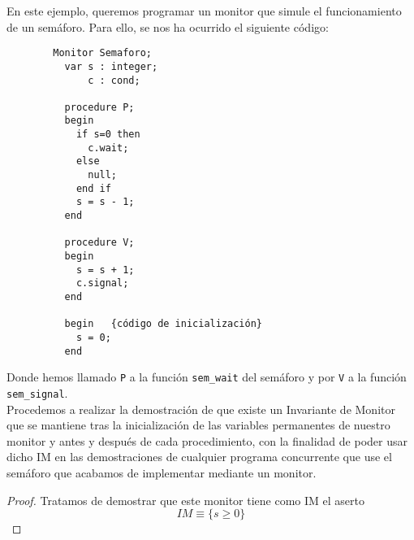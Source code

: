\begin{ejemplo}
    En este ejemplo, queremos programar un monitor que simule el funcionamiento de un semáforo. Para ello, se nos ha ocurrido el siguiente código:
    \begin{verbatim}
        Monitor Semaforo;
          var s : integer;
              c : cond;

          procedure P;
          begin
            if s=0 then
              c.wait;
            else
              null;
            end if
            s = s - 1;
          end

          procedure V;
          begin
            s = s + 1;
            c.signal;
          end

          begin   {código de inicialización}
            s = 0;
          end
    \end{verbatim}
    Donde hemos llamado \verb|P| a la función \verb|sem_wait| del semáforo y por \verb|V| a la función \verb|sem_signal|.\\

    Procedemos a realizar la demostración de que existe un Invariante de Monitor que se mantiene tras la inicialización de las variables permanentes de nuestro monitor y antes y después de cada procedimiento, con la finalidad de poder usar dicho IM en las demostraciones de cualquier programa concurrente que use el semáforo que acabamos de implementar mediante un monitor.
    \begin{proof}
        Tratamos de demostrar que este monitor tiene como IM el aserto
        \begin{equation*}
            IM \equiv \{s \geq 0\}
        \end{equation*}


\end{proof}
\end{ejemplo}

